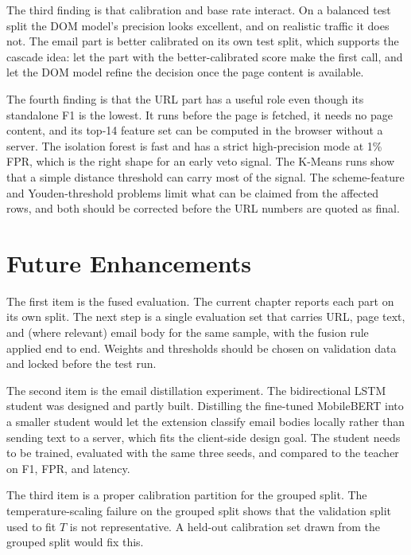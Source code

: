 \documentclass{FastFyp}
\begin{document}
The third finding is that calibration and base rate interact. On a balanced test split the DOM model's precision looks excellent, and on realistic traffic it does not. The email part is better calibrated on its own test split, which supports the cascade idea: let the part with the better-calibrated score make the first call, and let the DOM model refine the decision once the page content is available.

The fourth finding is that the URL part has a useful role even though its standalone F1 is the lowest. It runs before the page is fetched, it needs no page content, and its top-14 feature set can be computed in the browser without a server. The isolation forest is fast and has a strict high-precision mode at 1\% FPR, which is the right shape for an early veto signal. The K-Means runs show that a simple distance threshold can carry most of the signal. The scheme-feature and Youden-threshold problems limit what can be claimed from the affected rows, and both should be corrected before the URL numbers are quoted as final.

\section{Future Enhancements}
\label{sec:future}

The first item is the fused evaluation. The current chapter reports each part on its own split. The next step is a single evaluation set that carries URL, page text, and (where relevant) email body for the same sample, with the fusion rule applied end to end. Weights and thresholds should be chosen on validation data and locked before the test run.

The second item is the email distillation experiment. The bidirectional LSTM student was designed and partly built. Distilling the fine-tuned MobileBERT into a smaller student would let the extension classify email bodies locally rather than sending text to a server, which fits the client-side design goal. The student needs to be trained, evaluated with the same three seeds, and compared to the teacher on F1, FPR, and latency.

The third item is a proper calibration partition for the grouped split. The temperature-scaling failure on the grouped split shows that the validation split used to fit $T$ is not representative. A held-out calibration set drawn from the grouped split would fix this.
\end{document}
